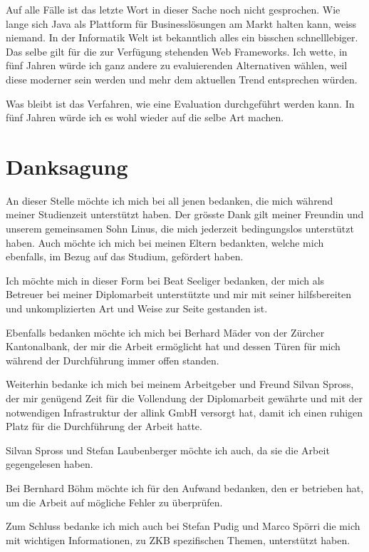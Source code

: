 Auf alle Fälle ist das letzte Wort in dieser Sache noch nicht gesprochen. Wie
lange sich Java als Plattform für Businesslösungen am Markt halten kann, weiss
niemand. In der Informatik Welt ist bekanntlich alles ein bisschen
schnelllebiger. Das selbe gilt für die zur Verfügung stehenden Web Frameworks.
Ich wette, in fünf Jahren würde ich ganz andere zu evaluierenden Alternativen
wählen, weil diese moderner sein werden und mehr dem aktuellen Trend
entsprechen würden.

Was bleibt ist das Verfahren, wie eine Evaluation durchgeführt werden kann. In
fünf Jahren würde ich es wohl wieder auf die selbe Art machen.

\section{Danksagung}

An dieser Stelle möchte ich mich bei all jenen bedanken, die mich während
meiner Studienzeit unterstützt haben. Der grösste Dank gilt meiner Freundin und
unserem gemeinsamen Sohn Linus, die mich jederzeit bedingungslos unterstützt
haben. Auch möchte ich mich bei meinen Eltern bedankten, welche mich
ebenfalls, im Bezug auf das Studium, gefördert haben.
  
Ich möchte mich in dieser Form bei Beat Seeliger bedanken, der mich als
Betreuer bei meiner Diplomarbeit unterstützte und mir mit seiner hilfsbereiten
und unkomplizierten Art und Weise zur Seite gestanden ist.
  
Ebenfalls bedanken möchte ich mich bei Berhard Mäder von der Zürcher
Kantonalbank, der mir die Arbeit ermöglicht hat und dessen Türen für mich
während der Durchführung immer offen standen.
  
Weiterhin bedanke ich mich bei meinem Arbeitgeber und Freund Silvan Spross,
der mir genügend Zeit für die Vollendung der Diplomarbeit gewährte und mit der
notwendigen Infrastruktur der allink GmbH versorgt hat, damit ich einen
ruhigen Platz für die Durchführung der Arbeit hatte.
  
Silvan Spross und Stefan Laubenberger möchte ich auch, da sie die Arbeit
gegengelesen haben.

Bei Bernhard Böhm möchte ich für den Aufwand bedanken, den er betrieben hat, um
die Arbeit auf mögliche Fehler zu überprüfen.
  
Zum Schluss bedanke ich mich auch bei Stefan Pudig und Marco Spörri die
mich mit wichtigen Informationen, zu \ac{ZKB} spezifischen Themen, unterstützt
haben.
